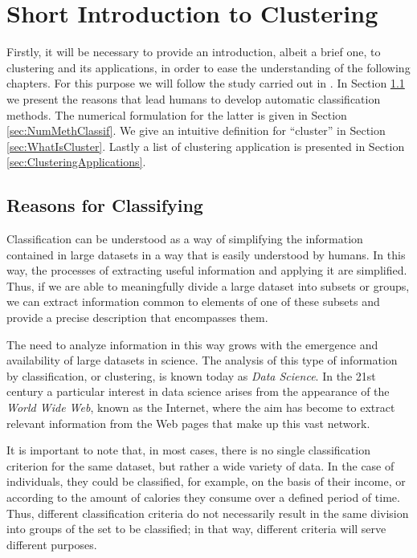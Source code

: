\chapter{Short Introduction to Clustering}\label{ch:IntroClustering}

Firstly, it will be necessary to provide an introduction, albeit a brief one, to clustering and its applications, in order to ease the understanding of the following chapters. For this purpose we will follow the study carried out in \cite{Everitt:2009:CA:1538772}. In Section  \ref{sec:ReasonsClassif} we present the reasons that lead humans to develop automatic classification methods. The numerical formulation for the latter is given in Section \ref{sec:NumMethClassif}. We give an intuitive definition for ``cluster'' in Section \ref{sec:WhatIsCluster}. Lastly a list of clustering application is presented in Section \ref{sec:ClusteringApplications}.

\section{Reasons for Classifying} \label{sec:ReasonsClassif}

Classification can be understood as a way of simplifying the information contained in large datasets in a way that is easily understood by humans. In this way, the processes of extracting useful information and applying it are simplified. Thus, if we are able to meaningfully divide a large dataset into subsets or groups, we can extract information common to elements of one of these subsets and provide a precise description that encompasses them.

The need to analyze information in this way grows with the emergence and availability of large datasets in science. The analysis of this type of information by classification, or clustering, is known today as \textit{Data Science}. In the 21st century a particular interest in data science arises from the appearance of the \textit{World Wide Web}, known as the Internet, where the aim has become to extract relevant information from the Web pages that make up this vast network.

It is important to note that, in most cases, there is no single classification criterion for the same dataset, but rather a wide variety of data. In the case of individuals, they could be classified, for example, on the basis of their income, or according to the amount of calories they consume over a defined period of time. Thus, different classification criteria do not necessarily result in the same division into groups of the set to be classified; in that way, different criteria will serve different purposes.

